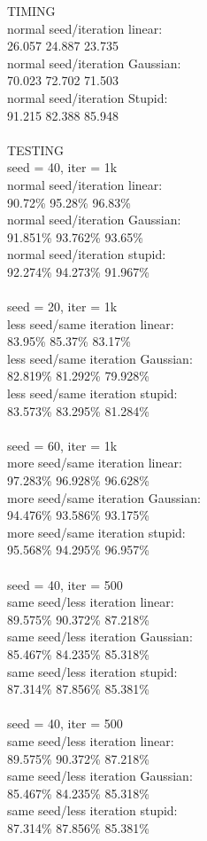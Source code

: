 \documentclass[submit]{harvardml}
\begin{document}
TIMING\\
normal seed/iteration linear:\\ 
26.057
24.887
23.735
\\
normal seed/iteration Gaussian:\\
70.023
72.702
71.503
\\
normal seed/iteration Stupid: \\
91.215
82.388
85.948
\\ \\
TESTING\\
seed = 40, iter = 1k\\
normal seed/iteration linear: \\
90.72\% 
95.28\%
96.83\%
\\
normal seed/iteration Gaussian:\\
91.851\%
93.762\%
93.65\%
\\
normal seed/iteration stupid:\\
92.274\%
94.273\%
91.967\%
\\ \\
seed = 20, iter = 1k \\
less seed/same iteration linear:\\
83.95\%
85.37\%
83.17\%\\
less seed/same iteration Gaussian:\\
82.819\%
81.292\%
79.928\%\\
less seed/same iteration stupid:\\
83.573\%
83.295\%
81.284\%
\\\\
seed = 60, iter = 1k\\
more seed/same iteration linear:\\
97.283\%
96.928\%
96.628\%
\\
more seed/same iteration Gaussian:\\
94.476\%
93.586\%
93.175\%
\\
more seed/same iteration stupid:\\
95.568\%
94.295\%
96.957\%
\\\\
seed = 40, iter = 500\\
same seed/less iteration linear:\\
89.575\%
90.372\%
87.218\%\\
same seed/less iteration Gaussian:\\
85.467\%
84.235\%
85.318\%\\
same seed/less iteration stupid:\\
87.314\%
87.856\%
85.381\%
\\\\
seed = 40, iter = 500\\
same seed/less iteration linear:\\
89.575\%
90.372\%
87.218\%\\
same seed/less iteration Gaussian:\\
85.467\%
84.235\%
85.318\%\\
same seed/less iteration stupid:\\
87.314\%
87.856\%
85.381\%\\\\
\end{document}
